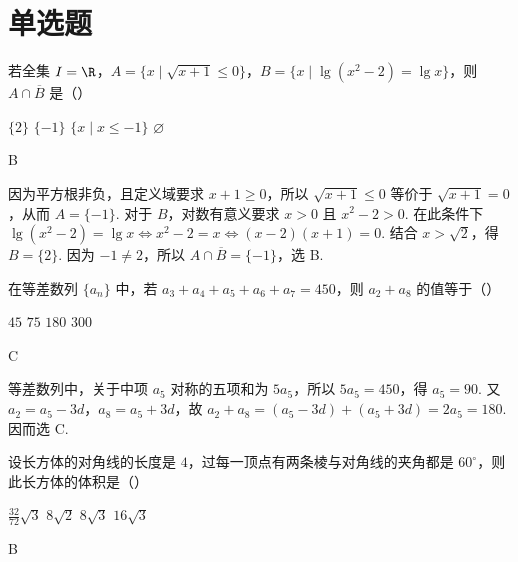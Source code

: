 \section{单选题}

\begin{problem}
若全集 \(I = \R\)，\(A = \{x \mid \sqrt{x + 1} \leqslant 0\}\)，\(B = \{x \mid \lg(x^2 - 2) = \lg x\}\)，则 \(A \cap \overline{B}\) 是（\quad）

\choices
    {\(\{2\}\)}
    {\(\{-1\}\)}
    {\(\{x \mid x \leqslant -1\}\)}
    {\(\varnothing\)}
\end{problem}

\begin{answer}
B
\end{answer}

\begin{solution}
因为平方根非负，且定义域要求 \(x+1\geqslant0\)，所以 \(\sqrt{x+1}\leqslant0\) 等价于 \(\sqrt{x+1}=0\)，从而 \(A=\{-1\}\). 对于 \(B\)，对数有意义要求 \(x>0\) 且 \(x^2-2>0\). 在此条件下
\(\lg(x^2-2)=\lg x\Longleftrightarrow x^2-2=x\Longleftrightarrow(x-2)(x+1)=0\). 结合 \(x>\sqrt2\)，得 \(B=\{2\}\). 因为 \(-1\neq2\)，所以 \(A\cap\overline B=\{-1\}\)，选 B.
\end{solution}

\begin{problem}
在等差数列 \(\{a_n\}\) 中，若 \(a_3 + a_4 + a_5 + a_6 + a_7 = 450\)，则 \(a_2 + a_8\) 的值等于（\quad）

\choices
    {\(45\)}
    {\(75\)}
    {\(180\)}
    {\(300\)}
\end{problem}

\begin{answer}
C
\end{answer}

\begin{solution}
等差数列中，关于中项 \(a_5\) 对称的五项和为 \(5a_5\)，所以 \(5a_5=450\)，得 \(a_5=90\). 又 \(a_2=a_5-3d\)，\(a_8=a_5+3d\)，故
\(a_2+a_8=(a_5-3d)+(a_5+3d)=2a_5=180\). 因而选 C.
\end{solution}

\begin{problem}
设长方体的对角线的长度是 \(4\)，过每一顶点有两条棱与对角线的夹角都是 \(60^{\circ}\)，则此长方体的体积是（\quad）

\choices
    {\(\frac{32}{72}\sqrt{3}\)}
    {\(8\sqrt{2}\)}
    {\(8\sqrt{3}\)}
    {\(16\sqrt{3}\)}
\end{problem}

\begin{answer}
B
\end{answer}

